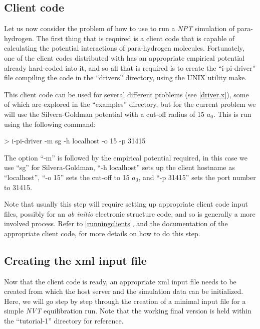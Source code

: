 \documentclass[11pt,english,fleqn]{report}
\newenvironment{code}{%
\footnotesize
\verbatim
}{
\endverbatim
\normalsize
}
\begin{document}
\label{part1}

\subsection{Client code}

Let us now consider the problem of how to use \ipi to run a \emph{NPT}
simulation of para-hydrogen. The first thing that is required is a
client code that is capable of calculating the potential interactions
of para-hydrogen molecules. Fortunately, one of the client codes distributed
with \ipi has an appropriate empirical potential already hard-coded
into it, and
so all that is required is to create the {}``i-pi-driver'' file
compiling the code in
the {}``drivers'' directory, using the UNIX utility make.

This client code can be used for several different problems
(see \ref{driver.x}), some of which
are explored in the {}``examples'' directory, but for the current problem
we will use the Silvera-Goldman potential with a cut-off radius
of 15 \(a_0\). This is run using the following command:

\begin{code}
> i-pi-driver -m sg -h localhost -o 15 -p 31415
\end{code}

The option {}``-m'' is followed by the empirical potential required,
in this case we use {}``sg'' for Silvera-Goldman,
{}``-h localhost'' sets up the client hostname
as {}``localhost'', {}``-o 15'' sets the cut-off to 15 \(a_0\),
and {}``-p 31415'' sets the port number to 31415.

Note that usually this step will require setting up appropriate
client code input files, possibly for an \emph{ab initio} electronic
structure code, and so is generally a more involved process. Refer
to \ref{runningclients}, and the documentation of the appropriate
client code, for more details on how to do this step.


\subsection{Creating the xml input file}

Now that the client code is ready, an appropriate xml input file needs
to be created from which the host server and the simulation data can
be initialized. Here, we will go step by step through the creation
of a minimal input file for a simple \emph{NVT} equilibration run. Note that
the working final version is held within the {}``tutorial-1'' directory
for reference.
\end{document}
